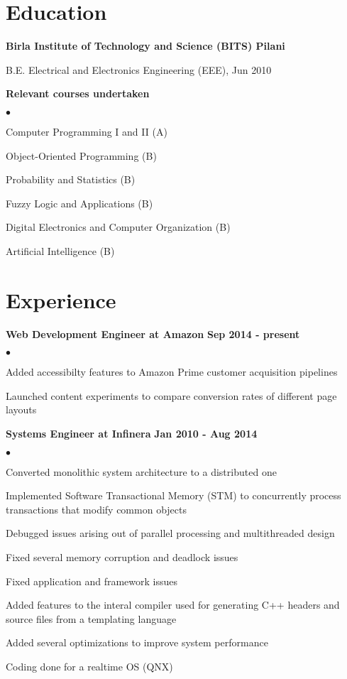 \documentclass[margin,line]{res}
\newenvironment{list1}{
  \begin{list}{\ding{113}}{%
      \setlength{\itemsep}{0in}
      \setlength{\parsep}{0in} \setlength{\parskip}{0in}
      \setlength{\topsep}{0in} \setlength{\partopsep}{0in}
      \setlength{\leftmargin}{0.17in}}}{\end{list}}
\newenvironment{list2}{
  \begin{list}{$\bullet$}{%
      \setlength{\itemsep}{0in}
      \setlength{\parsep}{0in} \setlength{\parskip}{0in}
      \setlength{\topsep}{0in} \setlength{\partopsep}{0in}
      \setlength{\leftmargin}{0.2in}}}{\end{list}}
\begin{document}

\section{\sc Education}
{\bf Birla Institute of Technology and Science (BITS) Pilani} \\
\vspace*{-.1in}
\begin{list1}
\item[] B.E. Electrical and Electronics Engineering (EEE), Jun 2010
\end{list1}

{\bf Relevant courses undertaken} \\
\begin{list2}
\item Computer Programming I and II (A)
\item Object-Oriented Programming (B)
\item Probability and Statistics (B)
\item Fuzzy Logic and Applications (B)
\item Digital Electronics and Computer Organization (B)
\item Artificial Intelligence (B)
\end{list2}

\section{\sc Experience}

{\bf Web Development Engineer at Amazon} \hfill {\bf Sep 2014 - present}\\
\begin{list2}
\item Added accessibilty features to Amazon Prime customer acquisition pipelines
\item Launched content experiments to compare conversion rates of different page layouts
\end{list2}

{\bf Systems Engineer at Infinera} \hfill {\bf Jan 2010 - Aug 2014}\\
\begin{list2}
\item Converted monolithic system architecture to a distributed one
\item Implemented Software Transactional Memory (STM) to concurrently process transactions that modify common objects
\item Debugged issues arising out of parallel processing and multithreaded design
\item Fixed several memory corruption and deadlock issues
\item Fixed application and framework issues
\item Added features to the interal compiler used for generating C++ headers and source files from a templating language
\item Added several optimizations to improve system performance
\item Coding done for a realtime OS (QNX)
\end{list2}
\end{document}
